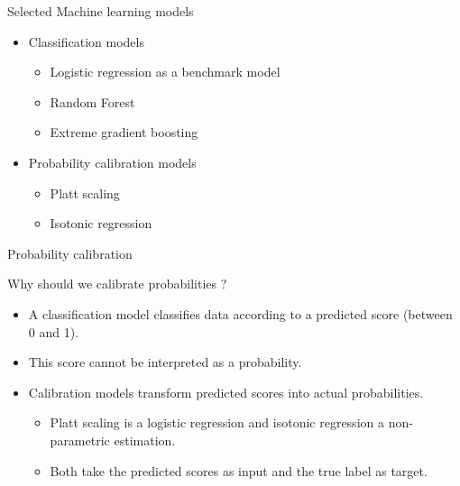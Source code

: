 \documentclass{beamer}
\begin{document}
\begin{frame}{Selected Machine learning models}

\begin{itemize}
    \item Classification models
    \begin{itemize}
        \item Logistic regression as a benchmark model
        \item Random Forest
        \item Extreme gradient boosting
    \end{itemize}
    \item Probability calibration models
    \begin{itemize}
        \item Platt scaling
        \item Isotonic regression
    \end{itemize}
\end{itemize}
    
\end{frame}


\begin{frame}{Probability calibration}

Why should we calibrate probabilities ?
\begin{itemize}
    \item A classification model classifies data according to a predicted score (between 0 and 1).
    \item This score cannot be interpreted as a probability.
    \item Calibration models transform  predicted scores into actual probabilities.
    \begin{itemize}
        \item Platt scaling is a logistic regression and isotonic regression a non-parametric estimation. 
        \item Both take the predicted scores as input and the true label as target.
    \end{itemize}
\end{itemize}

    
\end{frame}
\end{document}

